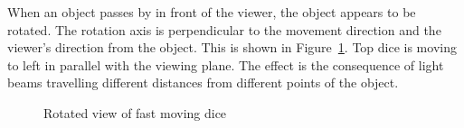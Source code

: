 \documentclass{egpubl}
\begin{document}
When an object passes by in front of the viewer, the object appears to be rotated. The rotation axis is perpendicular to the movement direction and the viewer's direction from the object. This is shown in Figure~\ref{fig:RotatingDice}. Top dice is moving to left in parallel with the viewing plane. The effect is the consequence of light beams travelling different distances from different points of the object.
\begin{figure}[htb]
\center
{}
\caption{Rotated view of fast moving dice}
\label{fig:RotatingDice}
\end{figure}
\end{document}
